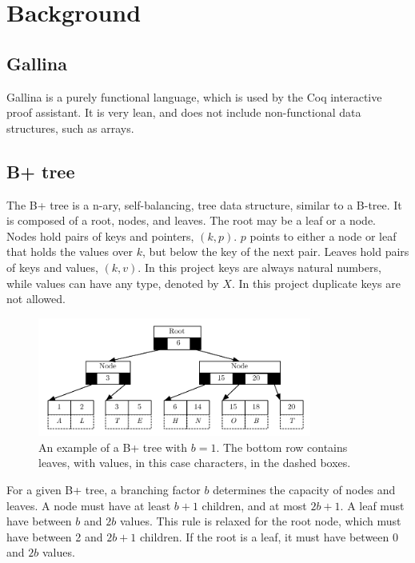 \section{Background}
\label{sec:Background}

\subsection{Gallina}
Gallina is a purely functional language, which is used by the Coq interactive proof assistant. It is very lean, and does not include non-functional data structures, such as arrays.

\subsection{B+ tree}
The B+ tree is a n-ary, self-balancing, tree data structure, similar to a B-tree. It is composed of a root, nodes, and leaves. The root may be a leaf or a node. Nodes hold pairs of keys and pointers, $(k, p)$. $p$ points to either a node or leaf that holds the values over $k$, but below the key of the next pair. Leaves hold pairs of keys and values, $(k, v)$. In this project keys are always natural numbers, while values can have any type, denoted by $X$. In this project duplicate keys are not allowed.

\begin{figure}
 \centering
   \includegraphics[width=90mm]{diagrams/BPlusTree.pdf}
 \caption{An example of a B+ tree with $b=1$. The bottom row contains leaves, with values, in this case characters, in the dashed boxes.}
 \label{fig:bplustree}
\end{figure}

For a given B+ tree, a branching factor $b$ determines the capacity of nodes and leaves. A node must have at least $b+1$ children, and at most $2b+1$. A leaf must have between $b$ and $2b$ values. This rule is relaxed for the root node, which must have between 2 and $2b+1$ children. If the root is a leaf, it must have between 0 and $2b$ values.

